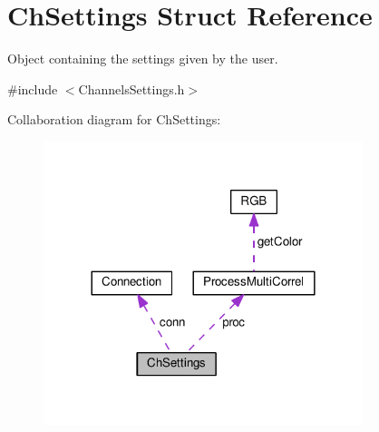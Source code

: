 \hypertarget{struct_ch_settings}{}\section{Ch\+Settings Struct Reference}
\label{struct_ch_settings}


Object containing the settings given by the user.  




{\ttfamily \#include $<$Channels\+Settings.\+h$>$}



Collaboration diagram for Ch\+Settings\+:
\nopagebreak
\begin{figure}[H]
\begin{center}
\leavevmode
\includegraphics[width=264pt]{struct_ch_settings__coll__graph}
\end{center}
\end{figure}
